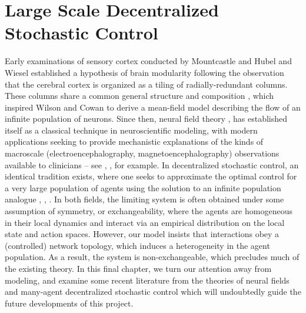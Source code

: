 \documentclass[12pt, oneside]{report}
\newcommand{\1}[1]{\mathbbm{1}_{\{#1\}}}
\theoremstyle{definition}
\begin{document}
\chapter{Large Scale Decentralized Stochastic Control}\label{ch4}
Early examinations of sensory cortex conducted by Mountcastle
\cite{Mountcastle_1957} and Hubel and Wiesel \cite{Hubel_Wiesel_1962}
established a hypothesis of brain modularity following the observation that the
cerebral cortex is organized as a tiling of radially-redundant columns. These
columns share a common general structure and composition
\cite{Mountcastle_1997}, which inspired Wilson and Cowan
\cite{Wilson_Cowan_1973} to derive a mean-field model describing the flow of an
infinite population of neurons. Since then, neural field theory
\cite{Coombes_2014}, \cite[part III]{Gerstner_Kistler_Naud_Paninski_2014} has
established itself as a classical technique in neuroscientific modeling, with
modern applications seeking to provide mechanistic explanations of the kinds of
macroscale (electroencephalography, magnetoencephalography) observations
available to clinicians -- see \cite{Nunez_1974},
\cite{Sanz-Leon_Knock_Spiegler_Jirsa_2015}, for example. In decentralized
stochastic control, an identical tradition exists, where one seeks to
approximate the optimal control for a very large population of agents using the
solution to an infinite population analogue \cite{Bauerle_2023},
\cite{Sanjari_Saldi_Yüksel_2023}, \cite[ch. 6]{Yuksel_Basar_2024}. In both
fields, the limiting system is often obtained under some assumption of symmetry,
or exchangeability, where the agents are homogeneous in their local dynamics and
interact via an empirical distribution on the local state and action spaces.
However, our model insists that interactions obey a (controlled) network
topology, which induces a heterogeneity in the agent population. As a result,
the system is non-exchangeable, which precludes much of the existing theory. In
this final chapter, we turn our attention away from modeling, and examine some
recent literature from the theories of neural fields and many-agent
decentralized stochastic control which will undoubtedly guide the future
developments of this project. 
\end{document}
